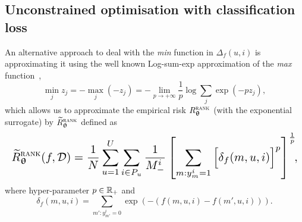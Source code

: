 %




\subsection{Unconstrained optimisation with classification loss}

An alternative approach to deal with the \emph{min} function in $\Delta_f(u, i)$ 
is approximating it using the well known Log-sum-exp approximation 
of the \emph{max} function~\cite[p. 72]{boyd2004convex},
\begin{equation*}
  \displaystyle \min_j z_j 
= \displaystyle -\max_j (-z_j) 
= \displaystyle -\lim_{p \to +\infty} \frac{1}{p} \log \sum_j \exp(-p z_j),
\end{equation*}
which allows us to approximate the empirical risk $R_{{\bm{\uptheta}}}^{\textsc{rank}}$ (with the exponential surrogate)
by $\widetilde R_{{\bm{\uptheta}}}^{\textsc{rank}}$ defined as
\begin{equation*}
\resizebox{\columnwidth}{!}{$
\begin{aligned}
\widetilde R_{\upthetabm}^{\textsc{rank}}(f, \DCal)
= \frac{1}{N} \sum_{u=1}^U \sum_{i \in P_u} \frac{1}{M_-^i} \left[
  \sum_{m: y_m^i = 1} \Big[ \delta_f(m, u, i) \Big]^p \right]^\frac{1}{p} \!\! ,
\end{aligned}
$}
\end{equation*}
where hyper-parameter $p \in \mathbb{R}_+$ and
$$
\delta_f(m, u, i) = \!\! \sum_{m': y_{m'}^i = 0} \!\! \exp(-(f(m, u, i) - f(m', u, i))).
$$


